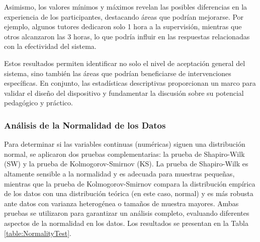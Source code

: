 Asimismo, los valores mínimos y máximos revelan las posibles diferencias en la experiencia de los participantes, destacando áreas que podrían mejorarse. Por ejemplo, algunos tutores dedicaron solo 1 hora a la supervisión, mientras que otros alcanzaron las 3 horas, lo que podría influir en las respuestas relacionadas con la efectividad del sistema.

Estos resultados permiten identificar no solo el nivel de aceptación general del sistema, sino también las áreas que podrían beneficiarse de intervenciones específicas. En conjunto, las estadísticas descriptivas proporcionan un marco para validar el diseño del dispositivo y fundamentar la discusión sobre su potencial pedagógico y práctico.

\subsubsection{Análisis de la Normalidad de los Datos}
Para determinar si las variables continuas (numéricas) siguen una distribución normal, se aplicaron dos pruebas complementarias: la prueba de Shapiro-Wilk (SW) y la prueba de Kolmogorov-Smirnov (KS). La prueba de Shapiro-Wilk es altamente sensible a la normalidad y es adecuada para muestras pequeñas, mientras que la prueba de Kolmogorov-Smirnov compara la distribución empírica de los datos con una distribución teórica (en este caso, normal) y es más robusta ante datos con varianza heterogénea o tamaños de muestra mayores. Ambas pruebas se utilizaron para garantizar un análisis completo, evaluando diferentes aspectos de la normalidad en los datos. Los resultados se presentan en la Tabla \ref{table:NormalityTest}.

